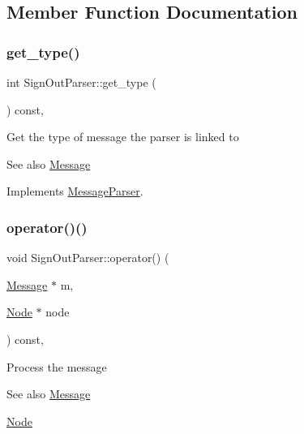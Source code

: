 \subsection{Member Function Documentation}
\mbox{\label{classSignOutParser_afe949de785ce36746d69e19515a72d24}} 
\subsubsection{\texorpdfstring{get\+\_\+type()}{get\_type()}}
{\footnotesize\ttfamily int Sign\+Out\+Parser\+::get\+\_\+type (\begin{DoxyParamCaption}{ }\end{DoxyParamCaption}) const\hspace{0.3cm}{\ttfamily [final]}, {\ttfamily [virtual]}}

Get the type of message the parser is linked to \begin{DoxySeeAlso}{See also}
\mbox{\hyperlink{classMessage}{Message}} 
\end{DoxySeeAlso}


Implements \mbox{\hyperlink{classMessageParser_aa7c495d7b28a394e5752ca25ffff69d8}{Message\+Parser}}.

\mbox{\label{classSignOutParser_a29ec80b982d783c10d46a431947bb319}} 
\subsubsection{\texorpdfstring{operator()()}{operator()()}}
{\footnotesize\ttfamily void Sign\+Out\+Parser\+::operator() (\begin{DoxyParamCaption}\item[{\mbox{\hyperlink{classMessage}{Message}} $\ast$}]{m,  }\item[{\mbox{\hyperlink{classNode}{Node}} $\ast$}]{node }\end{DoxyParamCaption}) const\hspace{0.3cm}{\ttfamily [final]}, {\ttfamily [virtual]}}

Process the message \begin{DoxySeeAlso}{See also}
\mbox{\hyperlink{classMessage}{Message}} 

\mbox{\hyperlink{classNode}{Node}}
\end{DoxySeeAlso}

